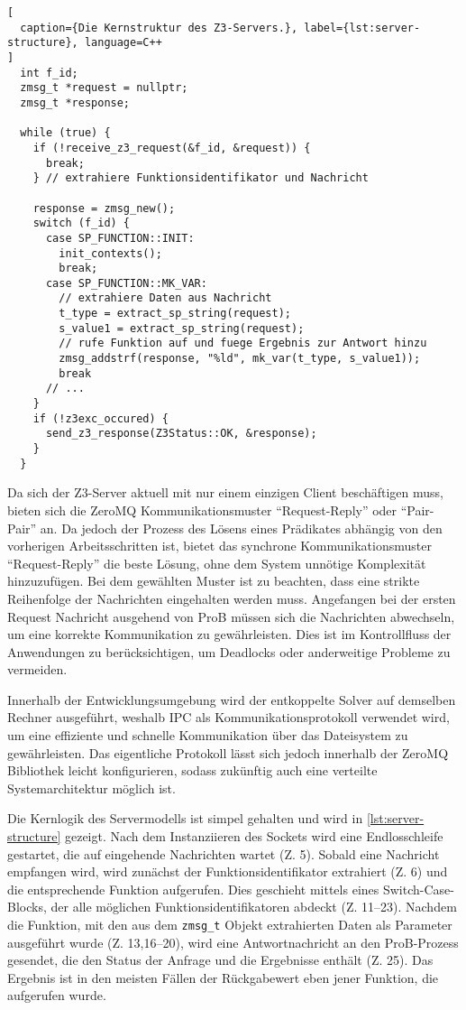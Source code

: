 \begin{lstlisting}[
  caption={Die Kernstruktur des Z3-Servers.}, label={lst:server-structure}, language=C++
]
  int f_id;
  zmsg_t *request = nullptr;
  zmsg_t *response;

  while (true) {
    if (!receive_z3_request(&f_id, &request)) {
      break;
    } // extrahiere Funktionsidentifikator und Nachricht

    response = zmsg_new();
    switch (f_id) {
      case SP_FUNCTION::INIT:
        init_contexts();
        break;
      case SP_FUNCTION::MK_VAR:
        // extrahiere Daten aus Nachricht
        t_type = extract_sp_string(request);
        s_value1 = extract_sp_string(request);
        // rufe Funktion auf und fuege Ergebnis zur Antwort hinzu
        zmsg_addstrf(response, "%ld", mk_var(t_type, s_value1));
        break
      // ...
    }
    if (!z3exc_occured) {
      send_z3_response(Z3Status::OK, &response);
    }
  }
\end{lstlisting}

Da sich der Z3-Server aktuell mit nur einem einzigen Client beschäftigen muss,
bieten sich die ZeroMQ Kommunikationsmuster \enquote{Request-Reply} oder \enquote{Pair-Pair} an.
Da jedoch der Prozess des Lösens eines Prädikates abhängig von den vorherigen Arbeitsschritten ist,
bietet das synchrone Kommunikationsmuster \enquote{Request-Reply} die beste Lösung, ohne dem System unnötige Komplexität hinzuzufügen.
Bei dem gewählten Muster ist zu beachten, dass eine strikte Reihenfolge der Nachrichten eingehalten werden muss.
Angefangen bei der ersten Request Nachricht ausgehend von ProB müssen sich die Nachrichten abwechseln, um eine korrekte Kommunikation zu gewährleisten.
Dies ist im Kontrollfluss der Anwendungen zu berücksichtigen, um Deadlocks oder anderweitige Probleme zu vermeiden.

Innerhalb der Entwicklungsumgebung wird der entkoppelte Solver auf demselben Rechner ausgeführt,
weshalb IPC als Kommunikationsprotokoll verwendet wird, um eine effiziente und schnelle Kommunikation über das Dateisystem zu gewährleisten.
Das eigentliche Protokoll lässt sich jedoch innerhalb der ZeroMQ Bibliothek leicht konfigurieren, sodass zukünftig auch eine verteilte Systemarchitektur möglich ist.

Die Kernlogik des Servermodells ist simpel gehalten und wird in \cref{lst:server-structure} gezeigt.
Nach dem Instanziieren des Sockets wird eine Endlosschleife gestartet, die auf eingehende Nachrichten wartet (Z. 5).
Sobald eine Nachricht empfangen wird, wird zunächst der Funktionsidentifikator extrahiert (Z. 6) und die entsprechende Funktion aufgerufen.
Dies geschieht mittels eines Switch-Case-Blocks, der alle möglichen Funktionsidentifikatoren abdeckt (Z. 11--23).
Nachdem die Funktion, mit den aus dem \texttt{zmsg\_t} Objekt extrahierten Daten als Parameter ausgeführt wurde (Z. 13,16--20),
wird eine Antwortnachricht an den ProB-Prozess gesendet, die den Status der Anfrage und die Ergebnisse enthält (Z. 25).
Das Ergebnis ist in den meisten Fällen der Rückgabewert eben jener Funktion, die aufgerufen wurde.

